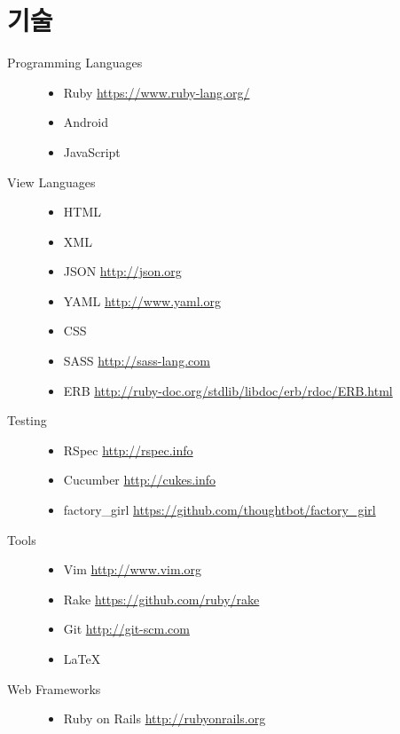 \documentclass[a4paper,10pt]{article}
\begin{document}
\section{기술}
\begin{description}
  \item[Programming Languages] \hfill
    \begin{itemize}
      \item Ruby \url{https://www.ruby-lang.org/}
      \item Android
      \item JavaScript
    \end{itemize}
  \item[View Languages] \hfill
    \begin{itemize}
      \item HTML
      \item XML
      \item JSON \url{http://json.org}
      \item YAML \url{http://www.yaml.org}
      \item CSS
      \item SASS \url{http://sass-lang.com}
      \item ERB \url{http://ruby-doc.org/stdlib/libdoc/erb/rdoc/ERB.html}
    \end{itemize}
  \item[Testing] \hfill
    \begin{itemize}
      \item RSpec \url{http://rspec.info}
      \item Cucumber \url{http://cukes.info}
      \item factory\_girl \url{https://github.com/thoughtbot/factory_girl}
    \end{itemize}
  \item[Tools] \hfill
    \begin{itemize}
      \item Vim \url{http://www.vim.org}
      \item Rake \url{https://github.com/ruby/rake}
      \item Git \url{http://git-scm.com}
      \item {\fb \LaTeX}\setmainfont[SmallCapsFont=Fontin-SmallCaps.otf]{Fontin.otf}
    \end{itemize}
  \item[Web Frameworks] \hfill
    \begin{itemize}
      \item Ruby on Rails \url{http://rubyonrails.org}

\end{itemize}
\end{description}
\end{document}
